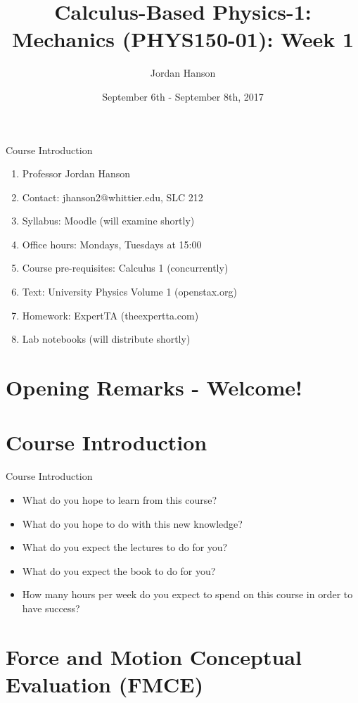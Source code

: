 \documentclass{beamer}
\title{Calculus-Based Physics-1: Mechanics (PHYS150-01): Week 1}
\date{September 6th - September 8th, 2017}
\author{Jordan Hanson}
\institute{Whittier College Department of Physics and Astronomy}
\begin{document}
\maketitle

\begin{frame}{Course Introduction}
\begin{enumerate}
\item Professor Jordan Hanson
\item Contact: jhanson2@whittier.edu, SLC 212
\item Syllabus: Moodle (will examine shortly)
\item Office hours: Mondays, Tuesdays at 15:00
\item Course pre-requisites: Calculus 1 (concurrently)
\item Text: University Physics Volume 1 (openstax.org)
\item Homework: ExpertTA (theexpertta.com)
\item Lab notebooks (will distribute shortly)
\end{enumerate}
\end{frame}

\section{Opening Remarks - Welcome!}

\section{Course Introduction}

\begin{frame}{Course Introduction}
\begin{itemize}
\item What do you hope to learn from this course?
\item What do you hope to do with this new knowledge?
\item What do you expect the lectures to do for you?
\item What do you expect the book to do for you?
\item How many hours per week do you expect to spend on this course in order to have success?
\end{itemize}
\end{frame}

\section{Force and Motion Conceptual Evaluation (FMCE)}
\end{document}
